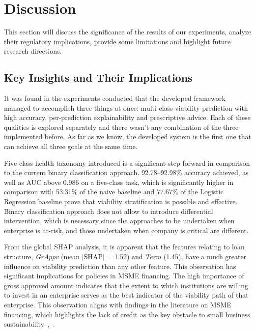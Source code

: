 \section{Discussion}

This section will discuss the significance of the results of our experiments, analyze their regulatory implications, provide some limitations and highlight future research directions.

\subsection{Key Insights and Their Implications}

It was found in the experiments conducted that the developed framework managed to accomplish three things at once: multi-class viability prediction with high accuracy, per-prediction explainability and prescriptive advice. Each of these qualities is explored separately and there wasn't any combination of the three implemented before. As far as we know, the developed system is the first one that can achieve all three goals at the same time.

Five-class health taxonomy introduced is a significant step forward in comparison to the current binary classification approach. 92.78--92.98\% accuracy achieved, as well as AUC above 0.986 on a five-class task, which is significantly higher in comparison with 53.31\% of the naive baseline and 77.67\% of the Logistic Regression baseline prove that viability stratification is possible and effective. Binary classification approach does not allow to introduce differential intervention, which is necessary since the approaches to be undertaken when enterprise is at-risk, and those undertaken when company is critical are different.

From the global SHAP analysis, it is apparent that the features relating to loan structure, \textit{GrAppv} (mean $|\text{SHAP}|$ = 1.52) and \textit{Term} (1.45), have a much greater influence on viability prediction than any other feature. This observation has significant implications for policies in MSME financing. The high importance of gross approved amount indicates that the extent to which institutions are willing to invest in an enterprise serves as the best indicator of the viability path of that enterprise. This observation aligns with findings in the literature on MSME financing, which highlights the lack of credit as the key obstacle to small business sustainability~\cite{6},~\cite{7}.

